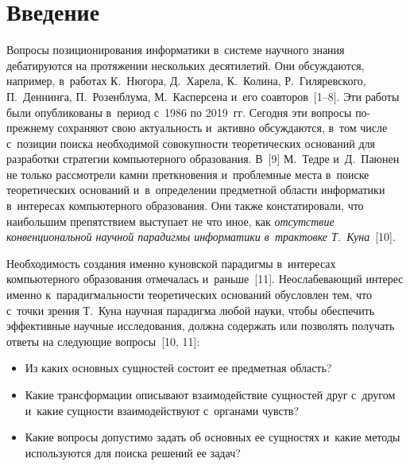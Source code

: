 
  



\thispagestyle{headings}

\begin{multicols}{2}

\label{st\stat}

\section{Введение}

  Вопросы позиционирования информатики в~сис\-те\-ме научного знания 
дебатируются на протяжении нескольких десятилетий. Они обсуждаются, 
например, в~работах К.~Нюгора, Д.~Харела, К.~Колина, Р.~Гиляревского,    
П.~Деннинга, П.~Розенблума, М.~Касперсена и~его соавторов~[1--8]. Эти 
работы были опубликованы в~период с~1986 по 2019~гг. Сегодня эти вопросы  
по-преж\-не\-му сохраняют свою актуальность и~активно обсуждаются, в~том 
чис\-ле с~позиции поиска необходимой совокупности теоретических оснований 
для разработки стратегии компьютерного образования. В~[9] М.~Тедре 
и~Д.~Паюнен не только рассмотрели камни преткновения и~проблемные места 
в~поиске теоретических оснований и~в~определении предметной области 
информатики в~интересах компьютерного образования. Они также 
констатировали, что наибольшим препятствием выступает не что иное, как 
\textit{отсутствие конвенциональной научной парадигмы информатики 
в~трактовке Т.~Куна}~[10].
  
  Необходимость создания именно куновской парадигмы в~интересах 
компьютерного образования отмечалась и~раньше~[11]. Неослабевающий 
интерес именно к~парадигмальности теоретических оснований обусловлен тем, 
что с~точки зрения Т.~Куна научная парадигма любой науки, чтобы обеспечить 
эффективные научные исследования, должна содержать или позволять 
получать ответы на следующие вопросы~[10, 11]:
\begin{itemize}
\item Из каких основных сущностей состоит ее предметная область?\\[-14pt]
  \item Какие трансформации описывают взаимодействие сущностей друг 
с~другом и~какие сущности взаимодействуют с~органами чувств?\\[-14pt]
  \item Какие вопросы допустимо задать об основных ее сущностях и~какие 
методы используются для поиска решений ее задач?
  \end{itemize}
  

\end{multicols}
